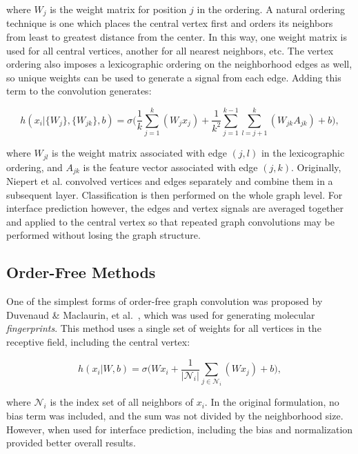 \noindent
where $W_j$ is the weight matrix for position $j$ in the ordering.
A natural ordering technique is one which places the central vertex first and orders its neighbors from least to greatest distance from the center. 
In this way, one weight matrix is used for all central vertices, another for all nearest neighbors, etc.
The vertex ordering also imposes a lexicographic ordering on the neighborhood edges as well, so unique weights can be used to generate a signal from each edge. 
Adding this term to the convolution generates:

\begin{equation}
h(x_i | \{ W_{j} \}, \{ W_{jk} \}, b)= \sigma \bigg( \frac{1}{k} \sum_{j=1}^{k}(W_{j} x_j) + \frac{1}{k^2} \sum_{j = 1}^{k-1} \sum_{l=j+1}^{k}(W_{jk} A_{jk})  + b \bigg),
\label{eq:patchysan_2e}
\end{equation}

\noindent
where $W_{jl}$ is the weight matrix associated with edge $(j, l)$ in the lexicographic ordering, and $A_{jk}$ is the feature vector associated with edge $(j, k)$.
Originally, Niepert et al. convolved vertices and edges separately and combine them in a subsequent layer.
Classification is then performed on the whole graph level.
For interface prediction however, the edges and vertex signals are averaged together and applied to the central vertex so that repeated graph convolutions may be performed without losing the graph structure.


\subsection{Order-Free Methods}
One of the simplest forms of order-free graph convolution was proposed by Duvenaud \& Maclaurin, et al.~\cite{duvenaud2015}, which was used for generating molecular \emph{fingerprints}.
This method uses a single set of weights for all vertices in the receptive field, including the central vertex:

\begin{equation}
h(x_i | W, b)= \sigma \bigg( W x_i +  \frac{1}{|\mathcal{N}_i|} \sum_{j \in \mathcal{N}_i} (W x_j) + b\bigg),
\label{eq:fingerprint}
\end{equation}

\noindent
where $\mathcal{N}_i$ is the index set of all neighbors of $x_i$.
In the original formulation, no bias term was included, and the sum was not divided by the neighborhood size.
However, when used for interface prediction, including the bias and normalization provided better overall results.

